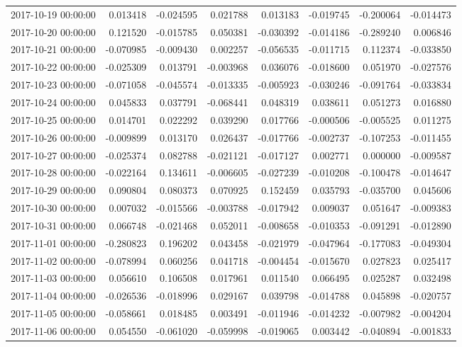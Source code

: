 \begin{tabular}{lrrrrrrr}
2017-10-19 00:00:00 & 0.013418 & -0.024595 & 0.021788 & 0.013183 & -0.019745 & -0.200064 & -0.014473 \\
2017-10-20 00:00:00 & 0.121520 & -0.015785 & 0.050381 & -0.030392 & -0.014186 & -0.289240 & 0.006846 \\
2017-10-21 00:00:00 & -0.070985 & -0.009430 & 0.002257 & -0.056535 & -0.011715 & 0.112374 & -0.033850 \\
2017-10-22 00:00:00 & -0.025309 & 0.013791 & -0.003968 & 0.036076 & -0.018600 & 0.051970 & -0.027576 \\
2017-10-23 00:00:00 & -0.071058 & -0.045574 & -0.013335 & -0.005923 & -0.030246 & -0.091764 & -0.033834 \\
2017-10-24 00:00:00 & 0.045833 & 0.037791 & -0.068441 & 0.048319 & 0.038611 & 0.051273 & 0.016880 \\
2017-10-25 00:00:00 & 0.014701 & 0.022292 & 0.039290 & 0.017766 & -0.000506 & -0.005525 & 0.011275 \\
2017-10-26 00:00:00 & -0.009899 & 0.013170 & 0.026437 & -0.017766 & -0.002737 & -0.107253 & -0.011455 \\
2017-10-27 00:00:00 & -0.025374 & 0.082788 & -0.021121 & -0.017127 & 0.002771 & 0.000000 & -0.009587 \\
2017-10-28 00:00:00 & -0.022164 & 0.134611 & -0.006605 & -0.027239 & -0.010208 & -0.100478 & -0.014647 \\
2017-10-29 00:00:00 & 0.090804 & 0.080373 & 0.070925 & 0.152459 & 0.035793 & -0.035700 & 0.045606 \\
2017-10-30 00:00:00 & 0.007032 & -0.015566 & -0.003788 & -0.017942 & 0.009037 & 0.051647 & -0.009383 \\
2017-10-31 00:00:00 & 0.066748 & -0.021468 & 0.052011 & -0.008658 & -0.010353 & -0.091291 & -0.012890 \\
2017-11-01 00:00:00 & -0.280823 & 0.196202 & 0.043458 & -0.021979 & -0.047964 & -0.177083 & -0.049304 \\
2017-11-02 00:00:00 & -0.078994 & 0.060256 & 0.041718 & -0.004454 & -0.015670 & 0.027823 & 0.025417 \\
2017-11-03 00:00:00 & 0.056610 & 0.106508 & 0.017961 & 0.011540 & 0.066495 & 0.025287 & 0.032498 \\
2017-11-04 00:00:00 & -0.026536 & -0.018996 & 0.029167 & 0.039798 & -0.014788 & 0.045898 & -0.020757 \\
2017-11-05 00:00:00 & -0.058661 & 0.018485 & 0.003491 & -0.011946 & -0.014232 & -0.007982 & -0.004204 \\
2017-11-06 00:00:00 & 0.054550 & -0.061020 & -0.059998 & -0.019065 & 0.003442 & -0.040894 & -0.001833 \\

\end{tabular}
